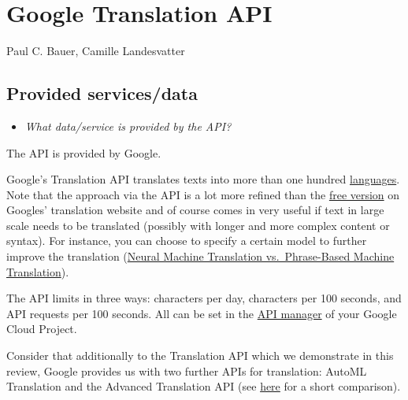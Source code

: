 \documentclass[
]{book}
\providecommand{\tightlist}{%
  \setlength{\itemsep}{0pt}\setlength{\parskip}{0pt}}
\begin{document}
\hypertarget{google-translation-api}{%
\chapter{Google Translation API}\label{google-translation-api}}

Paul C. Bauer, Camille Landesvatter

\hypertarget{provided-servicesdata-1}{%
\section{Provided services/data}\label{provided-servicesdata-1}}

\begin{itemize}
\tightlist
\item
  \emph{What data/service is provided by the API?}
\end{itemize}

The API is provided by Google.

Google's Translation API translates texts into more than one hundred \href{\%22https://cloud.google.com/translate/docs/languages\%22}{languages}. Note that the approach via the API is a lot more refined than the \href{\%22https://translate.google.com/?hl=de\%22}{free version} on Googles' translation website and of course comes in very useful if text in large scale needs to be translated (possibly with longer and more complex content or syntax). For instance, you can choose to specify a certain model to further improve the translation (\href{\%22https://cloud.google.com/translate/docs/basic/translating-text\#translate_translate_text-python\%22}{Neural Machine Translation vs.~Phrase-Based Machine Translation}).

The API limits in three ways: characters per day, characters per 100 seconds, and API requests per 100 seconds. All can be set in the \href{\%22https://console.developers.google.com/apis/api/translate.googleapis.com/quotas\%22}{API manager} of your Google Cloud Project.

Consider that additionally to the Translation API which we demonstrate in this review, Google provides us with two further APIs for translation: AutoML Translation and the Advanced Translation API (see \href{\%22https://cloud.google.com/translate/?utm_source=google\&utm_medium=cpc\&utm_campaign=emea-de-all-de-dr-bkws-all-all-trial-e-gcp-1010042\&utm_content=text-ad-none-any-DEV_c-CRE_170514365277-ADGP_Hybrid\%20\%7C\%20BKWS\%20-\%20EXA\%20\%7C\%20Txt\%20~\%20AI\%20\%26\%20ML\%20~\%20Cloud\%20Translation\%23v3-KWID_43700053282385063-kwd-74703397964-userloc_9042003\&utm_term=KW_google\%20translator\%20api-NET_g-PLAC_\&gclid=CjwKCAjw_JuGBhBkEiwA1xmbRZOxg7QzGmhTHWseHFN_V0Al_Xlf8wZVBfX9EURtitWDbe2dLcTWIxoCjj0QAvD_BwE\&gclsrc=aw.ds\#section-4\%22}{here} for a short comparison).
\end{document}
